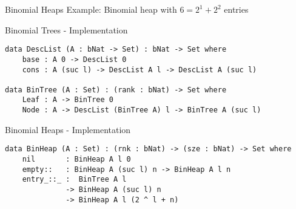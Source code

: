 \documentclass[11pt]{beamer}
\begin{document}


    \begin{frame}{Binomial Heaps}
        Example: Binomial heap with $6 = 2^1 + 2^2$ entries

        \begin{center}
            
        \end{center}
    \end{frame}

    \begin{frame}[fragile]{Binomial Trees - Implementation}
        \begin{lstlisting}[emph={DescList,BinTree,base,cons,Leaf,Node}]
data DescList (A : bNat -> Set) : bNat -> Set where
    base : A 0 -> DescList 0
    cons : A (suc l) -> DescList A l -> DescList A (suc l)

data BinTree (A : Set) : (rank : bNat) -> Set where
    Leaf : A -> BinTree 0
    Node : A -> DescList (BinTree A) l -> BinTree A (suc l)
        \end{lstlisting}
    \end{frame}

    \begin{frame}[fragile]{Binomial Heaps - Implementation}
        \begin{lstlisting}[add to literate={{::}{{{::}}}2},emph={BinHeap,nil,empty,entry}]
data BinHeap (A : Set) : (rnk : bNat) -> (sze : bNat) -> Set where
    nil       : BinHeap A l 0
    empty::   : BinHeap A (suc l) n -> BinHeap A l n
    entry_::_ :  BinTree A l
              -> BinHeap A (suc l) n
              -> BinHeap A l (2 ^ l + n)
        \end{lstlisting}
    \end{frame}
\end{document}
